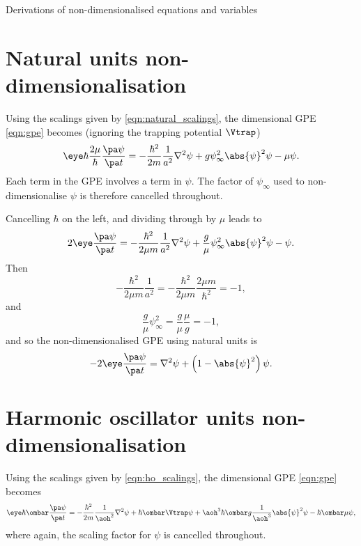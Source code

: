 \begin{chapter}{\label{cha:nondim}Derivations of non-dimensionalised equations
and variables}
  \section{Natural units non-dimensionalisation}
  Using the scalings given by \eqref{eqn:natural_scalings}, the dimensional GPE
  \eqref{eqn:gpe} becomes (ignoring the trapping potential $\Vtrap$)
  \begin{equation*}
    \eye \hbar \frac{2\mu}{\hbar} \frac{\pa \psi}{\pa t} =
    -\frac{\hbar^{2}}{2m} \frac{1}{a^{2}} \nabla^{2} \psi + g \psi_{\infty}^{2}
    \abs{\psi}^{2} \psi - \mu \psi.
  \end{equation*}
  Each term in the GPE involves a term in $\psi$.  The factor of
  $\psi_{\infty}$ used to non-dimensionalise $\psi$ is therefore cancelled
  throughout.
  
  Cancelling $\hbar$ on the left, and dividing through by $\mu$ leads to
  \begin{equation*}
    2\eye \frac{\pa \psi}{\pa t} = -\frac{\hbar^{2}}{2\mu m} \frac{1}{a^{2}}
    \nabla^{2} \psi + \frac{g}{\mu} \psi_{\infty}^{2} \abs{\psi}^{2} \psi -
    \psi.
  \end{equation*}
  Then
  \begin{equation*}
    -\frac{\hbar^{2}}{2\mu m} \frac{1}{a^{2}} = -\frac{\hbar^{2}}{2\mu m}
    \frac{2\mu m}{\hbar^{2}} = -1,
  \end{equation*}
  and
  \begin{equation*}
    \frac{g}{\mu} \psi_{\infty}^{2} = \frac{g}{\mu} \frac{\mu}{g} = -1,
  \end{equation*}
  and so the non-dimensionalised GPE using natural units is
  \begin{equation*}
    -2\eye\frac{\pa \psi}{\pa t} = \nabla^{2}\psi + \left(1 -
    \abs{\psi}^{2}\right)\psi.
  \end{equation*}

  \section{Harmonic oscillator units non-dimensionalisation}
  Using the scalings given by \eqref{eqn:ho_scalings}, the dimensional GPE
  \eqref{eqn:gpe} becomes
  \begin{equation*}
    \eye \hbar \ombar \frac{\pa \psi}{\pa t} = -\frac{\hbar^{2}}{2m}
    \frac{1}{\aoh^{2}} \nabla^{2} \psi + \hbar \ombar \Vtrap \psi + \aoh^{3}
    \hbar \ombar g \frac{1}{\aoh^{3}} \abs{\psi}^{2} \psi - \hbar \ombar \mu
    \psi,
  \end{equation*}
  where again, the scaling factor for $\psi$ is cancelled throughout.


\end{chapter}
